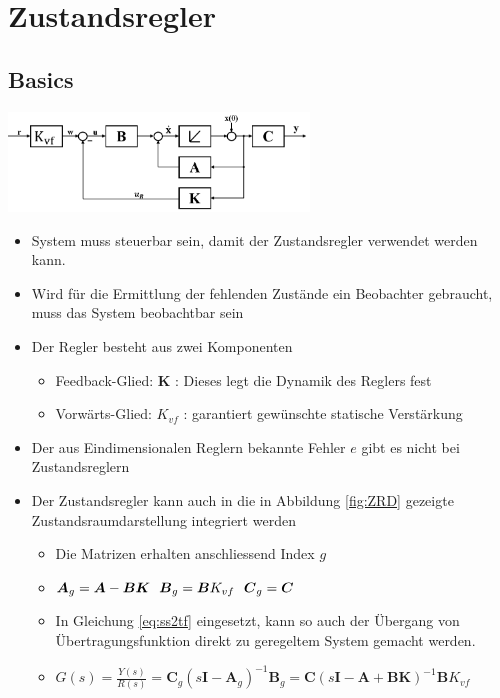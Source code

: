 \section{Zustandsregler}
\subsection{Basics}
\includegraphics[width=8cm]{./bilder/regler.png}
\begin{itemize}
	\item System muss steuerbar sein, damit der Zustandsregler verwendet werden kann.
	\item Wird für die Ermittlung der fehlenden Zustände ein Beobachter gebraucht, muss das System beobachtbar sein	
	\item Der Regler besteht aus zwei Komponenten
	\begin{itemize}
		\item Feedback-Glied: $\boldsymbol{K}$ : Dieses legt die Dynamik des Reglers fest
		\item Vorwärts-Glied: $K_{vf}$ : garantiert gewünschte statische Verstärkung
	\end{itemize}
	\item Der aus Eindimensionalen Reglern bekannte Fehler $e$ gibt es nicht bei Zustandsreglern
	\item Der Zustandsregler kann auch in die in Abbildung \ref{fig:ZRD} gezeigte Zustandsraumdarstellung integriert werden
	\begin{itemize}
		\item Die Matrizen erhalten anschliessend Index $g$ 
		\item []$\boldsymbol{A}_g = \boldsymbol{A}-\boldsymbol{BK} ~~ \boldsymbol{B}_g = \boldsymbol{B}K_{vf} ~~ \boldsymbol{C}_ g = \boldsymbol{C} \hspace{5 mm}$
		\item In Gleichung \ref{eq:ss2tf} eingesetzt, kann so auch der Übergang von Übertragungsfunktion direkt zu geregeltem System gemacht werden. 
		\item [] $G(s) = \frac{Y(s)}{R(s)} = \boldsymbol{C}_g\left(s\boldsymbol{I} - \boldsymbol{A}_g\right)^{-1}\boldsymbol{B}_g
					   = \boldsymbol{C}\left(s\boldsymbol{I}-\boldsymbol{A}+\boldsymbol{BK}\right)^{-1}\boldsymbol{B}K_{vf}$
	\end{itemize}
\end{itemize}

